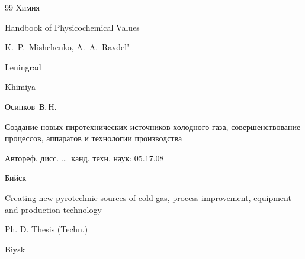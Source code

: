 \begin{thebibliography}{99}
\publ Химия



\misctransl

\book Handbook of Physicochemical Values

\eds K.~P.~Mishchenko, A.~A.~Ravdel'

\publaddr Leningrad

\publ Khimiya








\by Осипков~В.\,Н.

\thesis Создание новых пиротехнических источников холодного газа, совершенствование процессов, аппаратов и технологии производства

\thesisinfo Автореф. дисс. \dots\ канд. техн. наук: 05.17.08

\publaddr Бийск



\misctransl 

\thesis Creating new pyrotechnic sources of  cold gas, process improvement, equipment and production technology

\thesisinfo Ph. D. Thesis (Techn.)

\publaddr Biysk





\end{thebibliography}





\noindent

\hskip6.5cm \thedate \par\noindent

\hskip6.5cm\therevdate\par



\vspace{-10mm}



\makeengtitle



\renewcommand{\baselinestretch}{0.9}



\newpage





%

